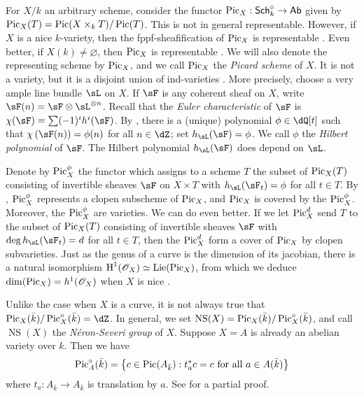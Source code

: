 For $X/k$ an arbitrary scheme, consider the functor 
$\operatorname{Pic}_X:\mathsf{Sch}_k^\circ\to\mathsf{Ab}$ given by 
$\operatorname{Pic}_X(T) = \operatorname{Pic}(X\times_k T)/\operatorname{Pic}(T)$. This is not in general 
representable. However, if $X$ is a nice $k$-variety, then the 
fppf-sheafification of $\operatorname{Pic}_X$ is representable \cite[4.1.38]{kl05}. Even 
better, if $X(k)\ne\varnothing$, then $\operatorname{Pic}_X$ is representable 
\cite[2.5]{kl05}. We will also denote the representing scheme by $\operatorname{Pic}_X$, and 
we call $\operatorname{Pic}_X$ the \emph{Picard scheme} of $X$. It is not a variety, but it 
is a disjoint union of ind-varieties \cite[4.8]{kl05}. More precisely, choose 
a very ample line bundle $\sL$ on $X$. If $\sF$ is any coherent 
sheaf on $X$, write 
$\sF(n) = \sF\otimes\sL^{\otimes n}$. Recall that the 
\emph{Euler characteristic} of $\sF$ is 
$\chi(\sF) = \sum (-1)^i h^i(\sF)$. By \cite[2.5.3]{gr61}, 
there is a (unique) polynomial $\phi\in \dQ[t]$ such that 
$\chi\left(\sF(n)\right) = \phi(n)$ for all 
$n\in\dZ$; set $h_\sL(\sF) = \phi$. We call $\phi$ the 
\emph{Hilbert polynomial} of $\sF$. The Hilbert polynomial 
$h_\sL(\sF)$ does depend on $\sL$.

Denote by 
$\operatorname{Pic}_X^\phi$ the functor which assigns to a scheme $T$ the subset of 
$\operatorname{Pic}_X(T)$ consisting of invertible sheaves $\sF$ on $X\times T$ with 
$h_\sL(\sF_t) = \phi$ for all $t\in T$. By \cite[6.20]{kl05}, 
$\operatorname{Pic}_X^\phi$ represents a clopen subscheme of $\operatorname{Pic}_X$, and $\operatorname{Pic}_X$ is 
covered by the $\operatorname{Pic}_X^\phi$. Moreover, the $\operatorname{Pic}_X^\phi$ are varieties. We can 
do even better. If we let $\operatorname{Pic}_X^d$ send $T$ to the subset of $\operatorname{Pic}_X(T)$ 
consisting of invertible sheaves $\sF$ with 
$\deg h_\sL(\sF_t) = d$ for all $t\in T$, then the 
$\operatorname{Pic}_X^d$ form a cover of $\operatorname{Pic}_X$ by clopen subvarieties. Just as the genus 
of a curve is the dimension of its jacobian, there is a natural isomorphism 
$\operatorname{H}^1(\mathscr{O}_X) \simeq \operatorname{Lie}(\operatorname{Pic}_X)$, from which we deduce 
$\dim(\operatorname{Pic}_X) = h^1(\mathscr{O}_X)$ when $X$ is nice \cite[5.11]{kl05}.

Unlike the case when $X$ is a curve, it is not always true that 
$\picard_X(\bar k)/\picard_X^\circ(\bar k) = \dZ$. In general, we set 
$\operatorname{NS}(X) = \operatorname{Pic}_X(\bar k) / \operatorname{Pic}_X^\circ(\bar k)$, and call 
$\operatorname{NS}(X)$ the \emph{N\'eron-Severi group} of $X$. 
Suppose $X=A$ is already an abelian variety over $k$. Then we have 
\[
  \operatorname{Pic}_A^\circ(\bar k) = \left\{c\in \operatorname{Pic}(A_{\bar k}) : t_a^* c = c\text{ for all }a\in A(\bar k)\right\} 
\]
where $t_a:A_{\bar k}\to A_{\bar k}$ is translation by $a$. See 
\cite[I.8.4]{mi-av} for a partial proof. 


